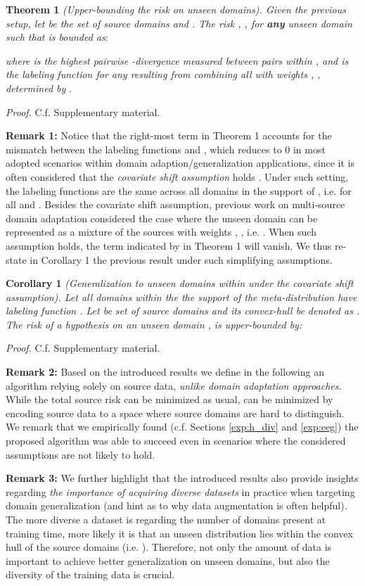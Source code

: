 \documentclass{article}
\begin{document}
\textbf{Theorem 1} \textit{(Upper-bounding the risk on unseen domains). Given the previous setup, let  be the set of source domains and  . The risk , , for \textbf{any} unseen domain  such that  is bounded as}:

\textit{where  is the highest pairwise -divergence measured between pairs within ,  and  is the labeling function for any  resulting from combining all  with weights , , determined by }.

\textit{Proof.} C.f. Supplementary material.


\textbf{Remark 1:} Notice that the right-most term in Theorem 1 accounts for the mismatch between the labeling functions  and , which reduces to 0 in most adopted scenarios within domain adaption/generalization applications, since it is often considered that the \emph{covariate shift assumption} holds \cite{ben2010impossibility}. Under such setting, the labeling functions are the same across all domains in the support of , i.e.  for all  and . Besides the covariate shift assumption, previous work on multi-source domain adaptation \cite{hoffman2018algorithms} considered the case where the unseen domain  can be represented as a mixture of the sources with weights , , i.e. . When such assumption holds, the term indicated by  in Theorem 1 will vanish. We thus re-state in Corollary 1 the previous result under such simplifying assumptions.

\textbf{Corollary 1} \textit{(Generalization to unseen domains within  under the covariate shift assumption). Let all domains within the the support of the meta-distribution  have labeling function . Let  be set of source domains and its convex-hull be denoted as . The risk  of a hypothesis  on an unseen domain , is upper-bounded by:}


\textit{Proof.} C.f. Supplementary material.

\textbf{Remark 2:} Based on the introduced results we define in the following an algorithm relying solely on source data, \emph{unlike domain adaptation approaches}. While the total source risk can be minimized as usual,  can be minimized by encoding source data to a space where source domains are hard to distinguish. We remark that we empirically found (c.f. Sections \ref{exp:h_div} and \ref{exp:eeg}) the proposed algorithm was able to succeed even in scenarios where the considered assumptions are not likely to hold. 

\textbf{Remark 3:} We further highlight that the introduced results also provide insights regarding \emph{the importance of acquiring diverse datasets} in practice when targeting domain generalization (and hint as to why data augmentation is often helpful). The more diverse a dataset is regarding the number of domains present at training time, more likely it is that an unseen distribution lies within the convex hull of the source domains (i.e. ). Therefore, not only the amount of data is important to achieve better generalization on unseen domains, but also the diversity of the training data is crucial. 
\end{document}
